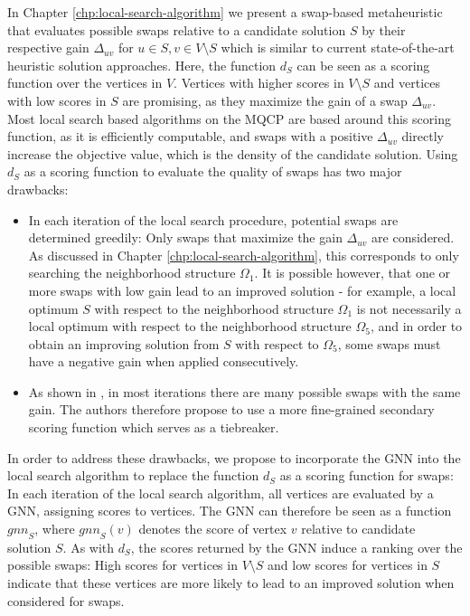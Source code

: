 \documentclass[draft,final]{vutinfth} %
\begin{document}
In Chapter \ref{chp:local-search-algorithm} we present a swap-based metaheuristic that evaluates possible swaps relative to a candidate solution $S$ by their respective gain $\Delta_{uv}$ for $u \in S, v \in V \setminus S$ which is similar to current state-of-the-art heuristic solution approaches. 
Here, the function $d_S$ can be seen as a scoring function over the vertices in $V$. Vertices with higher scores in $V \setminus S$ and vertices with low scores in $S$ are promising, as they maximize the gain of a swap $\Delta_{uv}$. 
Most local search based algorithms on the MQCP are based around this scoring function, as it is efficiently computable, and swaps with a positive $\Delta_{uv}$ directly increase the objective value, which is the density of the candidate solution. 
Using $d_S$ as a scoring function to evaluate the quality of swaps has two major drawbacks:
\begin{itemize}
    \item In each iteration of the local search procedure, potential swaps are determined greedily: Only swaps that maximize the gain $\Delta_{uv}$ are considered. As discussed in Chapter \ref{chp:local-search-algorithm}, this corresponds to only searching the neighborhood structure $\Omega_1$. It is possible however, that one or more swaps with low gain lead to an improved solution - for example, a local optimum $S$ with respect to the neighborhood structure $\Omega_1$ is not necessarily a local optimum with respect to the neighborhood structure $\Omega_5$, and in order to obtain an improving solution from $S$ with respect to $\Omega_5$, some swaps must have a negative gain when applied consecutively. 
    \item As shown in \cite{chen_nuqclq_2021}, in most iterations there are many possible swaps with the same gain. The authors therefore propose to use a more fine-grained secondary scoring function which serves as a tiebreaker. 
\end{itemize}

In order to address these drawbacks, we propose to incorporate the GNN into the local search algorithm to replace the function $d_S$ as a scoring function for swaps: In each iteration of the local search algorithm, all vertices are evaluated by a GNN, assigning scores to vertices. The GNN can therefore be seen as a function $\mathit{gnn}_S$, where $\mathit{gnn}_S(v)$ denotes the score of vertex $v$ relative to candidate solution $S$. 
As with $d_S$, the scores returned by the GNN induce a ranking over the possible swaps: High scores for vertices in $V \setminus S$ and low scores for vertices in $S$ indicate that these vertices are more likely to lead to an improved solution when considered for swaps. 
\end{document}
